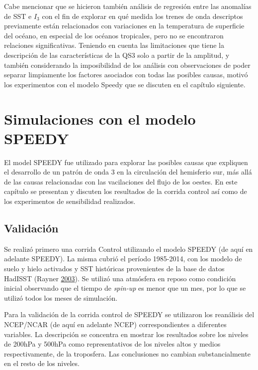 \documentclass[spanish,a4paper,12p]{book}
\begin{document}
Cabe mencionar que se hicieron también análisis de regresión entre las
anomalías de SST e \(I_3\) con el fin de explorar en qué medida los
trenes de onda descriptos previamente están relacionados con variaciones
en la temperatura de superficie del océano, en especial de los océanos
tropicales, pero no se encontraron relaciones significativas. Teniendo
en cuenta las limitaciones que tiene la descripción de las
características de la QS3 solo a partir de la amplitud, y también
considerando la imposibilidad de los análisis con observaciones de poder
separar limpiamente los factores asociados con todas las posibles
causas, motivó los experimentos con el modelo Speedy que se discuten en
el capítulo siguiente.

\chapter{Simulaciones con el modelo
SPEEDY}\label{simulaciones-con-el-modelo-speedy}

El model SPEEDY fue utilizado para explorar las posibles causas que
expliquen el desarrollo de un patrón de onda 3 en la circulación del
hemisferio sur, más allá de las causas relacionadas con las vacilaciones
del flujo de los oestes. En este capítulo se presentan y discuten los
resultados de la corrida control así como de los experimentos de
sensibilidad realizados.

\section{Validación}\label{validacion}

Se realizó primero una corrida Control utilizando el modelo SPEEDY (de
aquí en adelante SPEEDY). La misma cubrió el período 1985-2014, con los
modelo de suelo y hielo activados y SST históricas provenientes de la
base de datos HadISST (Rayner \protect\hyperlink{ref-Rayner2003}{2003}).
Se utilizó una atmósfera en reposo como condición inicial observando que
el tiempo de \emph{spin-up} es menor que un mes, por lo que se utilizó
todos los meses de simulación.

Para la validación de la corrida control de SPEEDY se utilizaron los
reanálisis del NCEP/NCAR (de aquí en adelante NCEP) correspondientes a
diferentes variables. La descripción se concentra en mostrar los
resultados sobre los niveles de 200hPa y 500hPa como representativos de
los niveles altos y medios respectivamente, de la troposfera. Las
conclusiones no cambian substancialmente en el resto de los niveles.
\end{document}
